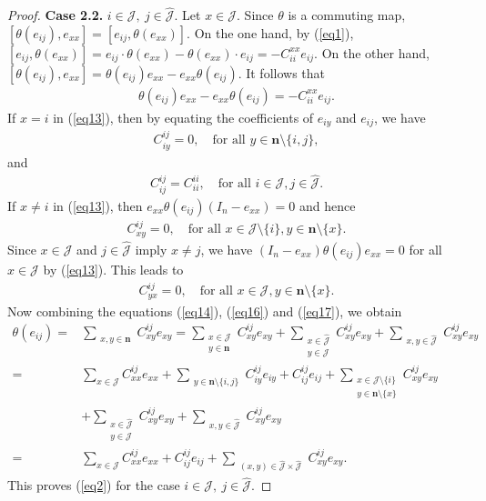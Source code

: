 \documentclass[reqno]{amsart}
\theoremstyle{plain}
\theoremstyle{definition}
\begin{document}
\begin{proof}
\textbf{Case 2.2.} $ i \in \mathcal{J},~j \in \hat{\mathcal{J}} $. Let $ x \in \mathcal{J} $. Since $ \theta $ is a commuting map, $ [\theta(e_{ij}), e_{xx}] = [e_{ij}, \theta(e_{xx})] $.
On the one hand, by (\ref{eq1}),
$
[e_{ij}, \theta(e_{xx})] = e_{ij} \cdot  \theta(e_{xx}) - \theta(e_{xx}) \cdot  e_{ij} = -C_{ii}^{xx} e_{ij}.
$
On the other hand, $ [\theta(e_{ij}), e_{xx}] = \theta(e_{ij}) e_{xx} - e_{xx} \theta(e_{ij}) $.
It follows that
 \begin{align}\label{eq13}
\theta(e_{ij}) e_{xx} - e_{xx} \theta(e_{ij}) = -C_{ii}^{xx} e_{ij} .
 \end{align}
If $ x = i $ in  (\ref{eq13}), then  by equating the coefficients of $ e_{iy} $ and $ e_{ij} $, we have
 \begin{align}\label{eq14}
C_{iy}^{ij} = 0, \quad \text{for all } y \in \mathbf{n} \setminus \{i, j\},
 \end{align}
and
 \begin{align}\label{eq15}
C_{ij}^{ij} = C_{ii}^{ii},\quad \text{for all } i \in \mathcal{J}, j \in \hat{\mathcal{J}}. 
 \end{align}
If $ x \neq i $ in (\ref{eq13}), then  $ e_{xx} \theta(e_{ij}) (I_n - e_{xx}) = 0 $ and hence
 \begin{align}\label{eq16}
C_{xy}^{ij} = 0, \quad \text{for all } x \in \mathcal{J} \setminus \{i\}, y \in \mathbf{n} \setminus \{x\}.
 \end{align}
Since $ x \in \mathcal{J}$ and $ j \in \hat{\mathcal{J}} $ imply  $ x \neq j $, we have $ (I_n - e_{xx}) \theta(e_{ij}) e_{xx} = 0 $ for all $x\in \mathcal{J}$ by (\ref{eq13}). This leads to
 \begin{align}\label{eq17}
C_{yx}^{ij} = 0, \quad \text{for all } x \in \mathcal{J}, y \in \mathbf{n} \setminus \{x\}.
 \end{align}
Now combining the equations (\ref{eq14}), (\ref{eq16}) and (\ref{eq17}), we obtain
\[
\begin{aligned}
\theta(e_{ij}) 
=& \sum_{\substack{x,y \in \mathbf{n}}} C_{xy}^{ij} e_{xy}=\sum_{\substack{x \in \mathcal{J} \\ y \in \mathbf{n}}} C_{xy}^{ij} e_{xy} + \sum_{\substack{x \in \hat{\mathcal{J}} \\ y \in \mathcal{J}}} C_{xy}^{ij} e_{xy} + \sum_{\substack{x,y \in \hat{\mathcal{J}}}} C_{xy}^{ij} e_{xy} \\
=& \sum_{x \in \mathcal{J}} C_{xx}^{ij} e_{xx} + \sum_{\substack{y \in \mathbf{n}\setminus \{i,j\} }} C_{iy}^{ij} e_{iy}+C_{ij}^{ij} e_{ij}
+\sum_{\substack{x \in \mathcal{J}\setminus \{i\} \\y \in \mathbf{n}\setminus \{x\} }} C_{xy}^{ij} e_{xy} \\
&+\sum_{\substack{x \in \hat{\mathcal{J}}\\y \in \mathcal{J} }} C_{xy}^{ij} e_{xy}+ \sum_{\substack{x,y \in \hat{\mathcal{J}}}} C_{xy}^{ij} e_{xy} \\
=& \sum_{x \in \mathcal{J}} C_{xx}^{ij} e_{xx} + C_{ij}^{ij} e_{ij} + 
 \sum_{\substack{(x,y) \in \hat{\mathcal{J}}\times \hat{\mathcal{J}}}} C_{xy}^{ij} e_{xy}.
\end{aligned}
\]
This proves (\ref{eq2}) for the case $i \in \mathcal{J}, ~j \in \hat{\mathcal{J}}$.


\end{proof}
\end{document}
